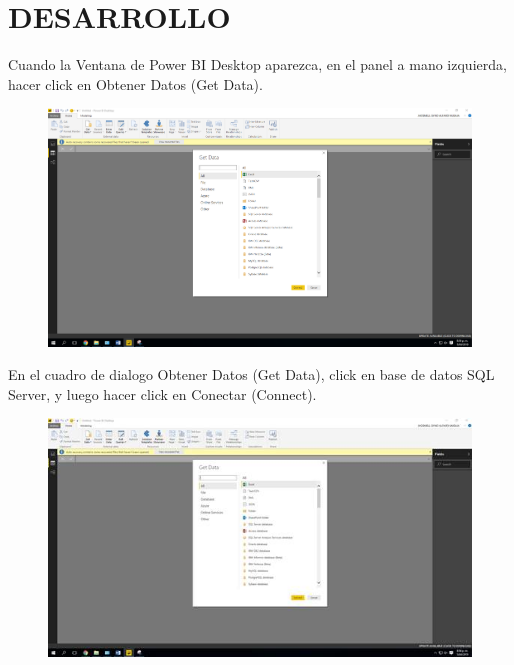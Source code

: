 {\section{DESARROLLO}
\item{Cuando la Ventana de Power BI Desktop aparezca, en el panel a mano izquierda, hacer click en Obtener
Datos (Get Data).}
\begin{figure}[httb]
\begin{center}
\includegraphics[width=15cm]{./Imagenes/image001}
\end{center}
\end{figure}
\item{ En el cuadro de dialogo Obtener Datos (Get Data), click en base de datos SQL Server, y luego hacer click en
Conectar (Connect). }
\begin{figure}[httb]
\begin{center}
\includegraphics[width=15cm]{./Imagenes/image002}
\end{center}
\end{figure}

}
